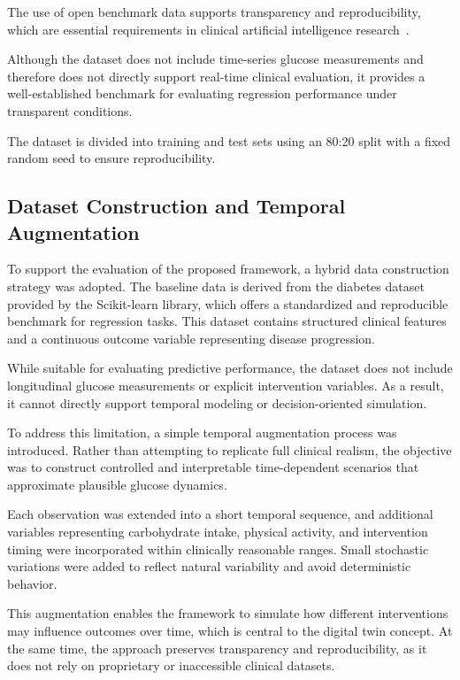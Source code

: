 \documentclass[journal]{IEEEtran}
\begin{document}
The use of open benchmark data supports transparency and reproducibility, which are essential requirements in clinical artificial intelligence research~\cite{ref16,ref17,ref27}.

Although the dataset does not include time-series glucose measurements and therefore does not directly support real-time clinical evaluation, it provides a well-established benchmark for evaluating regression performance under transparent conditions.

The dataset is divided into training and test sets using an 80:20 split with a fixed random seed to ensure reproducibility.

\subsection{Dataset Construction and Temporal Augmentation}
To support the evaluation of the proposed framework, a hybrid data construction strategy was adopted. The baseline data is derived from the diabetes dataset provided by the Scikit-learn library, which offers a standardized and reproducible benchmark for regression tasks. This dataset contains structured clinical features and a continuous outcome variable representing disease progression.

While suitable for evaluating predictive performance, the dataset does not include longitudinal glucose measurements or explicit intervention variables. As a result, it cannot directly support temporal modeling or decision-oriented simulation.

To address this limitation, a simple temporal augmentation process was introduced. Rather than attempting to replicate full clinical realism, the objective was to construct controlled and interpretable time-dependent scenarios that approximate plausible glucose dynamics.

Each observation was extended into a short temporal sequence, and additional variables representing carbohydrate intake, physical activity, and intervention timing were incorporated within clinically reasonable ranges. Small stochastic variations were added to reflect natural variability and avoid deterministic behavior.

This augmentation enables the framework to simulate how different interventions may influence outcomes over time, which is central to the digital twin concept. At the same time, the approach preserves transparency and reproducibility, as it does not rely on proprietary or inaccessible clinical datasets.
\end{document}

